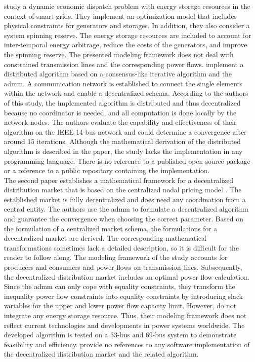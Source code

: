 \citet{xing2017} study a dynamic economic dispatch problem with energy storage resources in the context of smart grids. They implement an optimization model that includes physical constraints for generators and storages. In addition, they also consider a system spinning reserve. The energy storage resources are included to account for inter-temporal energy arbitrage, reduce the costs of the generators, and improve the spinning reserve. The presented modeling framework does not deal with constrained transmission lines and the corresponding power flows. \citet{xing2017} implement a distributed algorithm based on a consensus-like iterative algorithm and the \gls{admm}. A communication network is established to connect the single elements within the network and enable a decentralized schema. According to the authors of this study, the implemented algorithm is distributed and thus decentralized because no coordinator is needed, and all computation is done locally by the network nodes. The authors evaluate the capability and effectiveness of their algorithm on the IEEE 14-bus network and could determine a convergence after around 15 iterations. Although the mathematical derivation of the distributed algorithm is described in the paper, the study lacks the implementation in any programming language. There is no reference to a published open-source package or a reference to a public repository containing the implementation. \\

The second paper establishes a mathematical framework for a decentralized distribution market that is based on the centralized nodal pricing model \citep{yang2019}. The established market is fully decentralized and does need any coordination from a central entity. The authors use the \gls{admm} to formulate a decentralized algorithm and guarantee the convergence when choosing the correct parameter. Based on the formulation of a centralized market schema, the formulations for a decentralized market are derived. The corresponding mathematical transformations sometimes lack a detailed description, so it is difficult for the reader to follow along. The modeling framework of the study accounts for producers and consumers and power flows on transmission lines. Subsequently, the decentralized distribution market includes an optimal power flow calculation. Since the \gls{admm} can only cope with equality constraints, they transform the inequality power flow constraints into equality constraints by introducing slack variables for the upper and lower power flow capacity limit. However, \citet{yang2019} do not integrate any energy storage resource. Thus, their modeling framework does not reflect current technologies and developments in power systems worldwide. The developed algorithm is tested on a 33-bus and 69-bus system to demonstrate feasibility and efficiency. \citet{yang2019} provide no references to any software implementation of the decentralized distribution market and the related algorithm. \\

